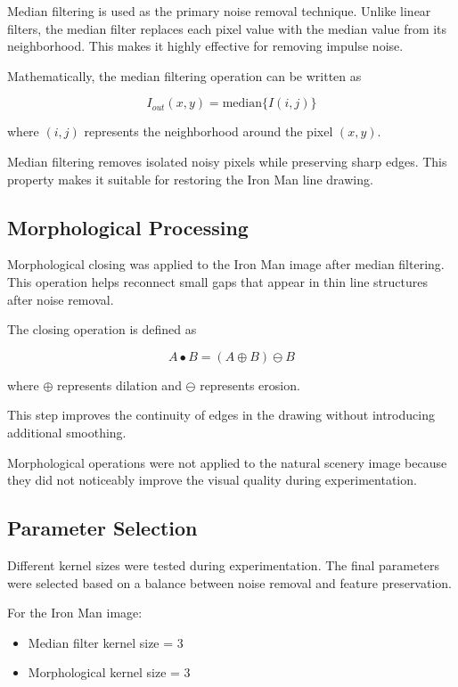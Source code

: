 \documentclass[letterpaper, 10 pt, conference]{ieeeconf}
\begin{document}
Median filtering is used as the primary noise removal technique. 
Unlike linear filters, the median filter replaces each pixel value with the median value from its neighborhood. This makes it highly effective for removing impulse noise.

Mathematically, the median filtering operation can be written as

\begin{equation}
I_{out}(x,y) = \text{median}\{I(i,j)\}
\end{equation}

where $(i,j)$ represents the neighborhood around the pixel $(x,y)$.

Median filtering removes isolated noisy pixels while preserving sharp edges. 
This property makes it suitable for restoring the Iron Man line drawing.

\subsection{Morphological Processing}

Morphological closing was applied to the Iron Man image after median filtering. 
This operation helps reconnect small gaps that appear in thin line structures after noise removal.

The closing operation is defined as

\begin{equation}
A \bullet B = (A \oplus B) \ominus B
\end{equation}

where $\oplus$ represents dilation and $\ominus$ represents erosion.

This step improves the continuity of edges in the drawing without introducing additional smoothing.

Morphological operations were not applied to the natural scenery image because they did not noticeably improve the visual quality during experimentation.

\subsection{Parameter Selection}

Different kernel sizes were tested during experimentation. The final parameters were selected based on a balance between noise removal and feature preservation.

For the Iron Man image:

\begin{itemize}
\item Median filter kernel size = 3
\item Morphological kernel size = 3
\end{itemize}
\end{document}
